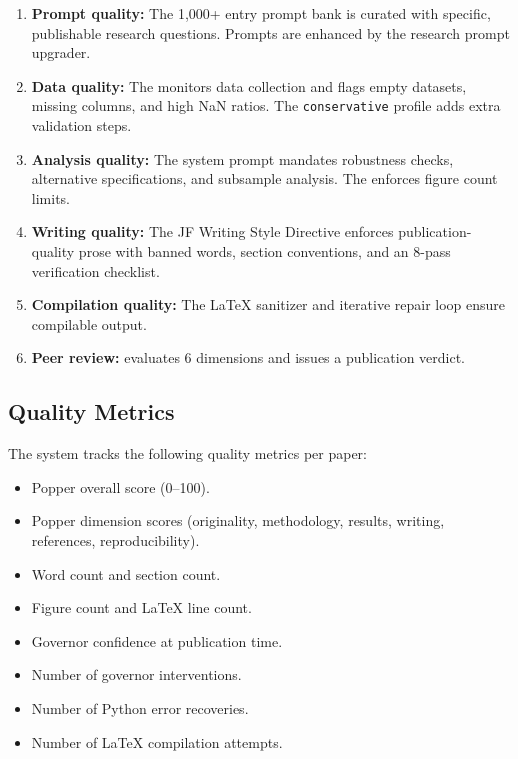 \begin{enumerate}
  \item \textbf{Prompt quality:} The 1,000+ entry prompt bank is curated with specific, publishable research questions. Prompts are enhanced by the research prompt upgrader.

  \item \textbf{Data quality:} The \governor monitors data collection and flags empty datasets, missing columns, and high NaN ratios. The \texttt{conservative} profile adds extra validation steps.

  \item \textbf{Analysis quality:} The system prompt mandates robustness checks, alternative specifications, and subsample analysis. The \governor enforces figure count limits.

  \item \textbf{Writing quality:} The JF Writing Style Directive enforces publication-quality prose with banned words, section conventions, and an 8-pass verification checklist.

  \item \textbf{Compilation quality:} The \LaTeX{} sanitizer and iterative repair loop ensure compilable output.

  \item \textbf{Peer review:} \popper evaluates 6 dimensions and issues a publication verdict.
\end{enumerate}

\subsection{Quality Metrics}

The system tracks the following quality metrics per paper:

\begin{itemize}
  \item Popper overall score (0--100).
  \item Popper dimension scores (originality, methodology, results, writing, references, reproducibility).
  \item Word count and section count.
  \item Figure count and \LaTeX{} line count.
  \item Governor confidence at publication time.
  \item Number of governor interventions.
  \item Number of Python error recoveries.
  \item Number of \LaTeX{} compilation attempts.
\end{itemize}

